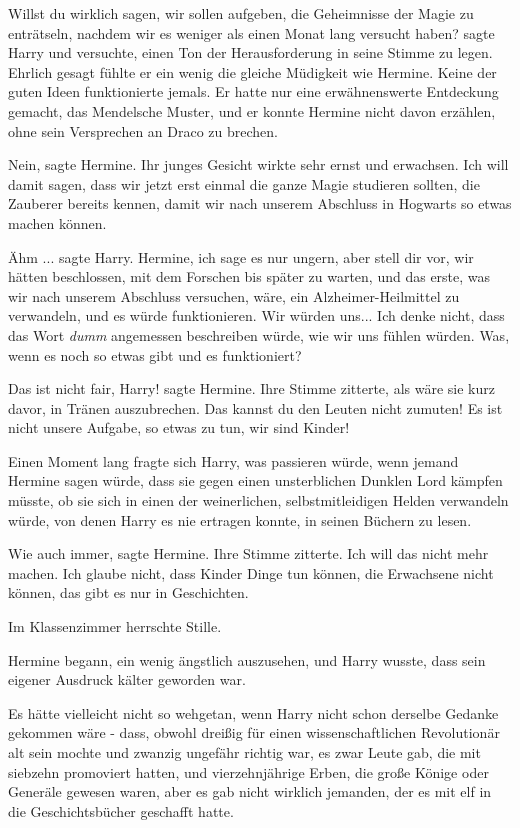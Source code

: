 \glqq{}Willst du wirklich sagen, wir sollen aufgeben, die Geheimnisse der Magie
zu enträtseln, nachdem wir es weniger als einen Monat lang versucht
haben?\grqq{} sagte Harry und versuchte, einen Ton der Herausforderung in seine
Stimme zu legen. Ehrlich gesagt fühlte er ein wenig die gleiche Müdigkeit wie
Hermine. Keine der guten Ideen funktionierte jemals. Er hatte nur eine
erwähnenswerte Entdeckung gemacht, das Mendelsche Muster, und er konnte Hermine
nicht davon erzählen, ohne sein Versprechen an Draco zu brechen.

\glqq{}Nein\grqq{}, sagte Hermine. Ihr junges Gesicht wirkte sehr ernst und
erwachsen. \glqq{}Ich will damit sagen, dass wir jetzt erst einmal die ganze
Magie studieren sollten, die Zauberer bereits kennen, damit wir nach unserem
Abschluss in Hogwarts so etwas machen können.\grqq{}

\glqq{}Ähm ...\grqq{} sagte Harry. \glqq{}Hermine, ich sage es nur ungern, aber
stell dir vor, wir hätten beschlossen, mit dem Forschen bis später zu warten,
und das erste, was wir nach unserem Abschluss versuchen, wäre, ein
Alzheimer-Heilmittel zu verwandeln, und es würde funktionieren. Wir würden
uns... Ich denke nicht, dass das Wort \emph{\glqq{}dumm\grqq{}} angemessen
beschreiben würde, wie wir uns fühlen würden. Was, wenn es noch so etwas gibt
und es funktioniert?\grqq{}

\glqq{}Das ist nicht fair, Harry!\grqq{} sagte Hermine. Ihre Stimme zitterte,
als wäre sie kurz davor, in Tränen auszubrechen. \glqq{}Das kannst du den Leuten
nicht zumuten! Es ist nicht unsere Aufgabe, so etwas zu tun, wir sind
Kinder!\grqq{}

Einen Moment lang fragte sich Harry, was passieren würde, wenn jemand Hermine
sagen würde, dass sie gegen einen unsterblichen Dunklen Lord kämpfen müsste, ob
sie sich in einen der weinerlichen, selbstmitleidigen Helden verwandeln würde,
von denen Harry es nie ertragen konnte, in seinen Büchern zu lesen.

\glqq{}Wie auch immer\grqq{}, sagte Hermine. Ihre Stimme zitterte. \glqq{}Ich
will das nicht mehr machen. Ich glaube nicht, dass Kinder Dinge tun können, die
Erwachsene nicht können, das gibt es nur in Geschichten.\grqq{}

Im Klassenzimmer herrschte Stille.

Hermine begann, ein wenig ängstlich auszusehen, und Harry wusste, dass sein
eigener Ausdruck kälter geworden war.

Es hätte vielleicht nicht so wehgetan, wenn Harry nicht schon derselbe Gedanke
gekommen wäre - dass, obwohl dreißig für einen wissenschaftlichen Revolutionär
alt sein mochte und zwanzig ungefähr richtig war, es zwar Leute gab, die mit
siebzehn promoviert hatten, und vierzehnjährige Erben, die große Könige oder
Generäle gewesen waren, aber es gab nicht wirklich jemanden, der es mit elf in
die Geschichtsbücher geschafft hatte.

